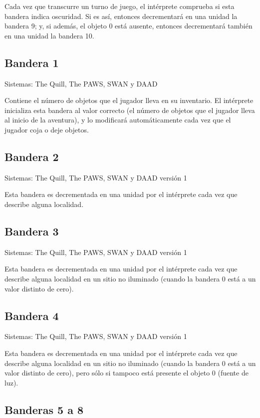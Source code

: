 \documentclass[11pt, a5paper]{article}
\newcommand{\quill}{\textsf{The Quill}\xspace}
\newcommand{\paw}{\textsf{The PAWS}\xspace}
\newcommand{\swan}{\textsf{SWAN}\xspace}
\newcommand{\daad}{\textsf{DAAD}\xspace}
\newcommand{\sistemas}[1]{\noindent Sistemas: #1 \nopagebreak}
\begin{document}
Cada vez que transcurre un turno de juego, el intérprete comprueba si esta bandera indica oscuridad. Si es así, entonces decrementará en una unidad la bandera 9; y, si además, el objeto 0 está ausente, entonces decrementará también en una unidad la bandera 10.

\subsection{Bandera 1}\label{flag1}

\sistemas{\quill, \paw, \swan y \daad}

Contiene el número de objetos que el jugador lleva en su inventario. El intérprete inicializa esta bandera al valor correcto (el número de objetos que el jugador lleva al inicio de la aventura), y lo modificará automáticamente cada vez que el jugador coja o deje objetos.

\subsection{Bandera 2}

\sistemas{\quill, \paw, \swan y \daad versión 1}

Esta bandera es decrementada en una unidad por el intérprete cada vez que describe alguna localidad.

\subsection{Bandera 3}

\sistemas{\quill, \paw, \swan y \daad versión 1}

Esta bandera es decrementada en una unidad por el intérprete cada vez que describe alguna localidad en un sitio no iluminado (cuando la bandera 0 está a un valor distinto de cero).

\subsection{Bandera 4}

\sistemas{\quill, \paw, \swan y \daad versión 1}

Esta bandera es decrementada en una unidad por el intérprete cada vez que describe alguna localidad en un sitio no iluminado (cuando la bandera 0 está a un valor distinto de cero), pero sólo si tampoco está presente el objeto 0 (fuente de luz).

\subsection{Banderas 5 a 8}
\end{document}
